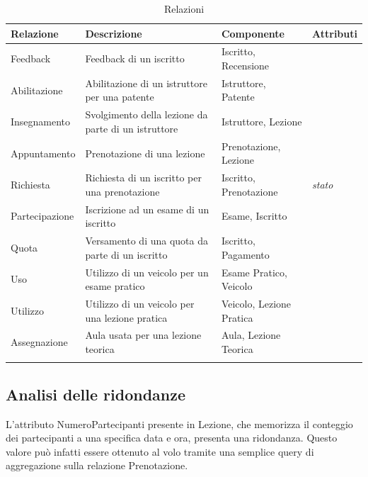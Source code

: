 \documentclass[10pt,twoside]{article}
\begin{document}
{    \begin{longtable}[H]{|>{\centering\arraybackslash}p{3cm}|
                            >{\centering\arraybackslash}p{3cm}|
                            >{\centering\arraybackslash}p{4.85cm}|
                            >{\centering\arraybackslash}p{3cm}|}
            \hline
            \rowcolor{lightgray!40}
            \textbf{Relazione} & \textbf{Descrizione} & \textbf{Componente} & \textbf{Attributi} \\
            \hline
            \rowcolor{white!40}
            Feedback & Feedback di un iscritto & Iscritto, Recensione & \\
            \hline
            \rowcolor{white!40}
            Abilitazione & Abilitazione di un istruttore per una patente & Istruttore, Patente & \\
            \hline
            \rowcolor{white!40}
            Insegnamento & Svolgimento della lezione da parte di un istruttore & Istruttore, Lezione & \\
            \hline
            \rowcolor{white!40}
            Appuntamento & Prenotazione di una lezione & Prenotazione, Lezione & \\
            \hline
            \rowcolor{white!40}
            Richiesta & Richiesta di un iscritto per una prenotazione & Iscritto, Prenotazione & \textit{stato}\\
            \hline
            \rowcolor{white!40}
            Partecipazione & Iscrizione ad un esame di un iscritto & Esame, Iscritto & \\
            \hline
            \rowcolor{white!40}
            Quota & Versamento di una quota da parte di un iscritto & Iscritto, Pagamento & \\
            \hline
            \rowcolor{white!40}
            Uso & Utilizzo di un veicolo per un esame pratico & Esame Pratico, Veicolo& \\
            \hline
            \rowcolor{white!40}
            Utilizzo & Utilizzo di un veicolo per una lezione pratica & Veicolo, Lezione Pratica & \\
            \hline
            \rowcolor{white!40}
            Assegnazione & Aula usata per una lezione teorica & Aula, Lezione Teorica & \\
            \hline
        \caption{Relazioni}
        \label{fig:tabellaRelazioni}
    \end{longtable}

    \subsection{Analisi delle ridondanze}{
        L’attributo NumeroPartecipanti presente in Lezione, che memorizza il conteggio dei partecipanti a una specifica data e ora, presenta una ridondanza. Questo valore può infatti essere ottenuto al volo tramite una semplice query di aggregazione sulla relazione Prenotazione.

}}
\end{document}
